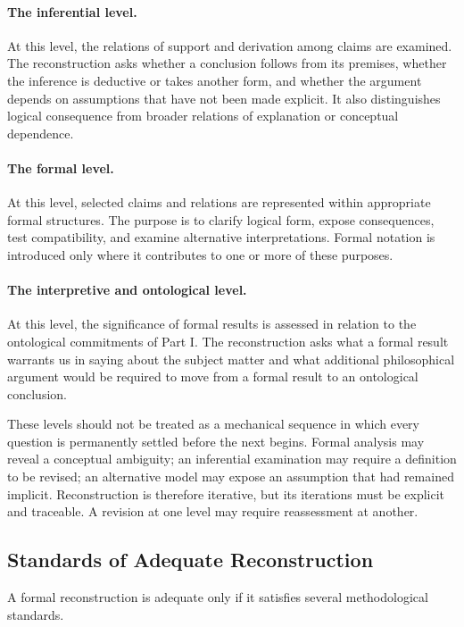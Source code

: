 \paragraph{The inferential level.}
At this level, the relations of support and derivation among claims are
examined. The reconstruction asks whether a conclusion follows from its
premises, whether the inference is deductive or takes another form, and
whether the argument depends on assumptions that have not been made
explicit. It also distinguishes logical consequence from broader relations
of explanation or conceptual dependence.

\paragraph{The formal level.}
At this level, selected claims and relations are represented within
appropriate formal structures. The purpose is to clarify logical form,
expose consequences, test compatibility, and examine alternative
interpretations. Formal notation is introduced only where it contributes
to one or more of these purposes.

\paragraph{The interpretive and ontological level.}
At this level, the significance of formal results is assessed in relation
to the ontological commitments of Part I. The reconstruction asks what a
formal result warrants us in saying about the subject matter and what
additional philosophical argument would be required to move from a formal
result to an ontological conclusion.

These levels should not be treated as a mechanical sequence in which every
question is permanently settled before the next begins. Formal analysis may
reveal a conceptual ambiguity; an inferential examination may require a
definition to be revised; an alternative model may expose an assumption
that had remained implicit. Reconstruction is therefore iterative, but its
iterations must be explicit and traceable. A revision at one level may
require reassessment at another.

\subsection{Standards of Adequate Reconstruction}

A formal reconstruction is adequate only if it satisfies several
methodological standards.

